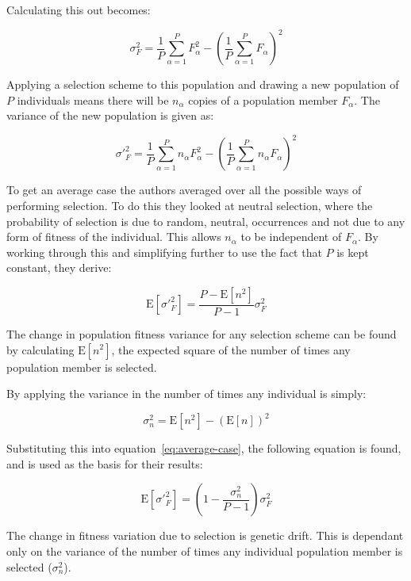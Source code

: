 \documentclass[10pt, a4paper]{article}
\begin{document}
Calculating this out becomes:

\begin{equation}
\sigma_F^2 = \frac{1}{P}\sum^{P}_{\alpha=1}{F^{2}_{\alpha}} - \left(
\frac{1}{P}\sum^{P}_{\alpha=1}{F_{\alpha}}\right)^2
\end{equation}

Applying a selection scheme to this population and drawing a new population of
$P$ individuals means there will be $n_\alpha$ copies of a population member
$F_\alpha$. The variance of the new population is given as:

\begin{equation}
\sigma'^2_F = \frac{1}{P} \sum^{P}_{\alpha=1}{n_\alpha F^2_\alpha} - \left(
\frac{1}{P} \sum^P_{\alpha=1}{n_\alpha F_\alpha}\right)^2
\end{equation}

To get an average case the authors averaged over all the possible ways of
performing selection. To do this they looked at neutral selection, where the
probability of selection is due to random, neutral, occurrences and not due to
any form of fitness of the individual. This allows $n_\alpha$ to be independent
of $F_\alpha$. By working through this and simplifying further to use the fact
that $P$ is kept constant, they derive:

\begin{equation}
\text{E}[\sigma'^2_F] = \frac{P - \text{E}[n^2]}{P-1}\sigma^2_F
\label{eq:average-case}
\end{equation}

The change in population fitness variance for any selection scheme can be found
by calculating $\text{E}[n^2]$, the expected square of the number of times any
population member is selected.

By applying the variance in the number of times any individual is simply:

\begin{equation}
\sigma^2_n = \text{E}[n^2] - (\text{E}[n])^2
\end{equation}

Substituting this into equation~\ref{eq:average-case}, the following equation
is found, and is used as the basis for their results:

\begin{equation}
\text{E}[\sigma'^2_F] = \left( 1 - \frac{\sigma^2_n}{P-1}\right) \sigma^2_F
\end{equation}

The change in fitness variation due to selection is genetic drift. This is
dependant only on the variance of the number of times any individual population
member is selected ($\sigma^2_n$).
\end{document}
